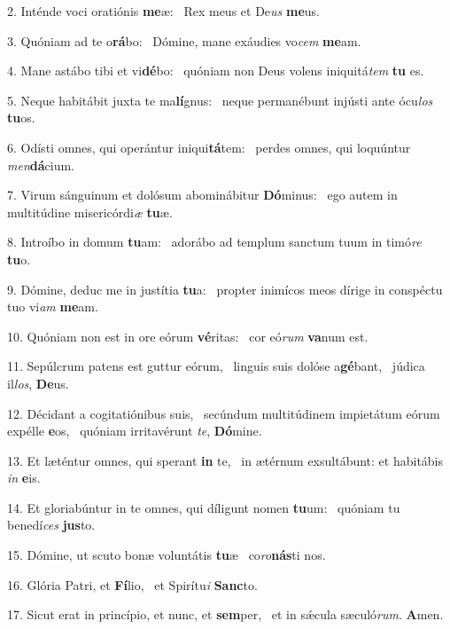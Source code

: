 2. Inténde voci oratiónis \textbf{me}æ: \ast\  Rex meus et De\textit{us} \textbf{me}us.\

3. Quóniam ad te o\textbf{rá}bo: \ast\  Dómine, mane exáudies vo\textit{cem} \textbf{me}am.\

4. Mane astábo tibi et vi\textbf{dé}bo: \ast\  quóniam non Deus volens iniquitá\textit{tem} \textbf{tu} es.\

5. Neque habitábit juxta te ma\textbf{lí}gnus: \ast\  neque permanébunt injústi ante ócu\textit{los} \textbf{tu}os.\

6. Odísti omnes, qui operántur iniqui\textbf{tá}tem: \ast\  perdes omnes, qui loquúntur \textit{men}\textbf{dá}cium.\

7. Virum sánguinum et dolósum abominábitur \textbf{Dó}minus: \ast\  ego autem in multitúdine misericórdi\textit{æ} \textbf{tu}æ.\

8. Introíbo in domum \textbf{tu}am: \ast\  adorábo ad templum sanctum tuum in timó\textit{re} \textbf{tu}o.\

9. Dómine, deduc me in justítia \textbf{tu}a: \ast\  propter inimícos meos dírige in conspéctu tuo vi\textit{am} \textbf{me}am.\

10. Quóniam non est in ore eórum \textbf{vé}ritas: \ast\  cor eó\textit{rum} \textbf{va}num est.\

11. Sepúlcrum patens est guttur eórum, \dag\  linguis suis dolóse a\textbf{gé}bant, \ast\  júdica il\textit{los}, \textbf{De}us.\

12. Décidant a cogitatiónibus suis, \dag\  secúndum multitúdinem impietátum eórum expélle \textbf{e}os, \ast\  quóniam irritavérunt \textit{te}, \textbf{Dó}mine.\

13. Et læténtur omnes, qui sperant \textbf{in} te, \ast\  in ætérnum exsultábunt: et habitábis \textit{in} \textbf{e}is.\

14. Et gloriabúntur in te omnes, qui díligunt nomen \textbf{tu}um: \ast\  quóniam tu benedí\textit{ces} \textbf{jus}to.\

15. Dómine, ut scuto bonæ voluntátis \textbf{tu}æ \ast\  co\textit{ro}\textbf{nás}ti nos.\

16. Glória Patri, et \textbf{Fí}lio, \ast\  et Spirítu\textit{i} \textbf{Sanc}to.\

17. Sicut erat in princípio, et nunc, et \textbf{sem}per, \ast\  et in sǽcula sæculó\textit{rum}. \textbf{A}men.\

